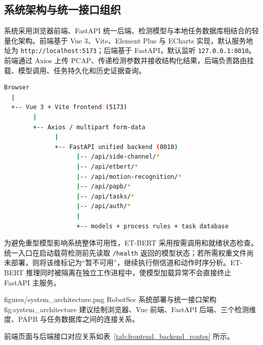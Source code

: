 \subsection{系统架构与统一接口组织}
\label{subsec:architecture}

系统采用浏览器前端、FastAPI 统一后端、检测模型与本地任务数据库相结合的轻量化架构。前端基于 Vue 3、Vite、Element Plus 与 ECharts 实现，默认服务地址为 \texttt{http://localhost:5173}；后端基于 FastAPI，默认监听 \texttt{127.0.0.1:8010}。前端通过 Axios 上传 PCAP、传递检测参数并接收结构化结果，后端负责路由挂载、模型调用、任务持久化和历史证据查询。

\begin{lstlisting}[language=bash,caption={RobotSec 部署与检测链路}]
Browser
  |
  +-- Vue 3 + Vite frontend (5173)
        |
        +-- Axios / multipart form-data
              |
              +-- FastAPI unified backend (8010)
                    |-- /api/side-channel/*
                    |-- /api/etbert/*
                    |-- /api/motion-recognition/*
                    |-- /api/papb/*
                    |-- /api/tasks/*
                    |-- /api/auth/*
                    |
                    +-- models + process rules + task database
\end{lstlisting}

为避免重型模型影响系统整体可用性，ET-BERT 采用按需调用和就绪状态检查。统一入口在启动载荷检测前先读取 \texttt{/health} 返回的模型状态；若所需权重文件尚未部署，则将该维标记为“暂不可用”，继续执行侧信道和动作时序分析。ET-BERT 推理同时被隔离在独立工作进程中，使模型加载异常不会直接终止 FastAPI 主服务。

\RobotSecFigure
  {figures/system_architecture.png}
  {RobotSec 系统部署与统一接口架构}
  {fig:system_architecture}
  {建议绘制浏览器、Vue 前端、FastAPI 后端、三个检测维度、PAPB 与任务数据库之间的连接关系。}

前端页面与后端接口对应关系如表~\ref{tab:frontend_backend_routes} 所示。

